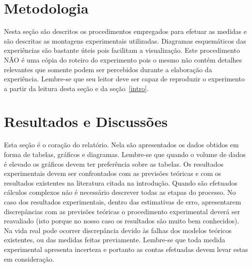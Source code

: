 \documentclass[a4paper, 12pt]{article}
\begin{document}

\section{Metodologia}
Nesta seção são descritos os procedimentos empregados para efetuar as medidas e são descritas as montagens experimentais utilizadas. Diagramas esquemáticos das experiências são bastante úteis pois facilitam a visualização.  Este procedimento NÃO é uma cópia do roteiro do experimento pois o mesmo não contém detalhes relevantes que somente podem ser percebidos durante a elaboração da experiência. Lembre-se que seu leitor deve ser capaz de reproduzir o experimento a partir da leitura desta seção e da seção~\ref{intro}.

\section{Resultados e Discussões}
Esta seção é o coração do relatório. Nela são apresentados os dados obtidos em forma de tabelas, gráficos e diagramas. Lembre-se que quando o volume de dados é elevado os gráficos devem ter preferência sobre as tabelas. Os resultados experimentais devem ser confrontados com as previsões teóricas e com os resultados existentes na literatura citada na introdução. Quando são efetuados cálculos complexos não é necessário descrever todas as etapas do processo. No caso dos resultados experimentais, dentro das estimativas de erro, apresentarem discrepâncias com as previsões teóricas o procedimento experimental deverá ser reavaliado (isto porque no nosso caso os resultados são muito bem conhecidos). Na vida real pode ocorrer discrepância devido às falhas dos modelos teóricos existentes, ou das medidas feitas previamente. Lembre-se que toda medida experimental apresenta incerteza e portanto as contas efetuadas devem levar estas em consideração.
\end{document}
